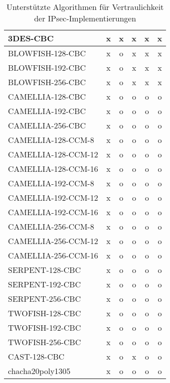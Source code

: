 \begin{center}
\begin{table}[h]
\begin{tabularx}{\textwidth}{|X|c|c|c|c|c|}
3DES-CBC             &  x  & x & x & x & x \\  \hline
BLOWFISH-128-CBC     &  x  & o & x & x & x \\  \hline
BLOWFISH-192-CBC     &  x  & o & x & x & x \\  \hline
BLOWFISH-256-CBC     &  x  & o & x & x & x \\  \hline
CAMELLIA-128-CBC     &  x  & o & o & o & o \\  \hline
CAMELLIA-192-CBC     &  x  & o & o & o & o \\  \hline
CAMELLIA-256-CBC     &  x  & o & o & o & o \\  \hline
CAMELLIA-128-CCM-8   &  x  & o & o & o & o \\  \hline
CAMELLIA-128-CCM-12  &  x  & o & o & o & o \\  \hline
CAMELLIA-128-CCM-16  &  x  & o & o & o & o \\  \hline
CAMELLIA-192-CCM-8   &  x  & o & o & o & o \\  \hline
CAMELLIA-192-CCM-12  &  x  & o & o & o & o \\  \hline
CAMELLIA-192-CCM-16  &  x  & o & o & o & o \\  \hline
CAMELLIA-256-CCM-8   &  x  & o & o & o & o \\  \hline
CAMELLIA-256-CCM-12  &  x  & o & o & o & o \\  \hline
CAMELLIA-256-CCM-16  &  x  & o & o & o & o \\  \hline
SERPENT-128-CBC      &  x  & o & o & o & o \\  \hline
SERPENT-192-CBC      &  x  & o & o & o & o \\  \hline
SERPENT-256-CBC      &  x  & o & o & o & o \\  \hline
TWOFISH-128-CBC      &  x  & o & o & o & o \\  \hline
TWOFISH-192-CBC      &  x  & o & o & o & o \\  \hline
TWOFISH-256-CBC      &  x  & o & o & o & o \\  \hline
CAST-128-CBC         &  x  & o & x & o & o \\  \hline
chacha20poly1305     &  x  & o & o & o & o \\  \hline
\end{tabularx}
\label{tab:IPsec-Implementierungen-Vertraulichkeit-Algorithmen}
\caption{Unterstützte Algorithmen für Vertraulichkeit der IPsec-Implementierungen}
\end{table}


\end{center}
